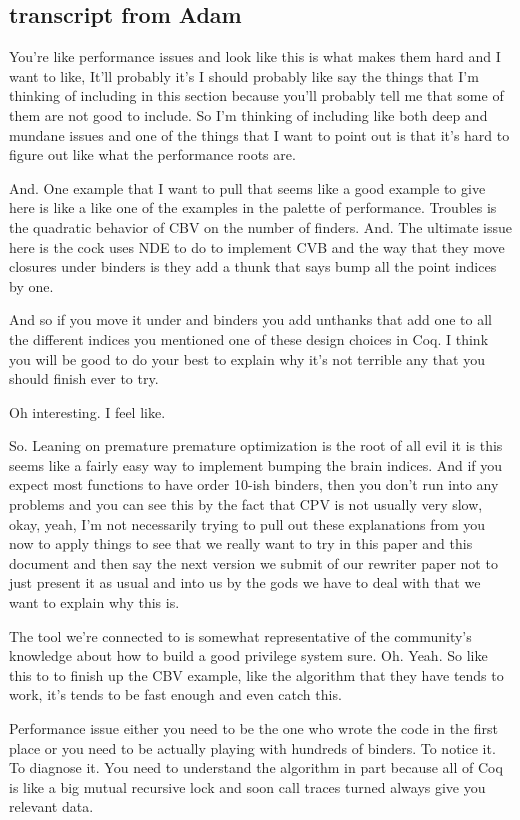 \begin{subappendices}
    
    \section{transcript from Adam}
    You're like performance issues and look like this is what makes them hard and I want to like, It'll probably it's I should probably like say the things that I'm thinking of including in this section because you'll probably tell me that some of them are not good to include. So I'm thinking of including like both deep and mundane issues and one of the things that I want to point out is that it's hard to figure out like what the performance roots are. 
    
    And. One example that I want to pull that seems like a good example to give here is like a like one of the examples in the palette of performance. Troubles is the quadratic behavior of CBV on the number of finders. And. The ultimate issue here is the cock uses NDE to do to implement CVB and the way that they move closures under binders is they add a thunk that says bump all the point indices by one. 
    
    And so if you move it under and binders you add unthanks that add one to all the different indices you mentioned one of these design choices in Coq. I think you will be good to do your best to explain why it's not terrible any that you should finish ever to try. 
    
    Oh interesting. I feel like. 
    
    So. Leaning on premature premature optimization is the root of all evil it is this seems like a fairly easy way to implement bumping the brain indices. And if you expect most functions to have order 10-ish binders, then you don't run into any problems and you can see this by the fact that CPV is not usually very slow, okay, yeah, I'm not necessarily trying to pull out these explanations from you now to apply things to see that we really want to try in this paper and this document and then say the next version we submit of our rewriter paper not to just present it as usual and into us by the gods we have to deal with that we want to explain why this is. 
    
    The tool we're connected to is somewhat representative of the community's knowledge about how to build a good privilege system sure. Oh. Yeah. So like this to to finish up the CBV example, like the algorithm that they have tends to work, it's tends to be fast enough and even catch this. 
    
    Performance issue either you need to be the one who wrote the code in the first place or you need to be actually playing with hundreds of binders. To notice it. To diagnose it. You need to understand the algorithm in part because all of Coq is like a big mutual recursive lock and soon call traces turned always give you relevant data. 
    

\end{subappendices}
